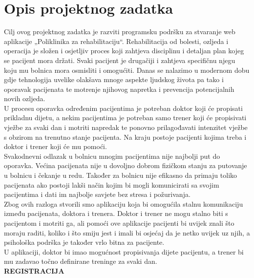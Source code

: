 \chapter{Opis projektnog zadatka}
		
		
		Cilj ovog projektnog zadatka je razviti programsku podršku za stvaranje web aplikacije „Poliklinika za rehabilitaciju“. Rehabilitacija od bolesti, ozljeda i operacija je složen i osjetljiv proces koji zahtjeva disciplinu i detaljan plan kojeg se pacijent mora držati. Svaki pacijent je drugačiji i zahtjeva specifičnu njegu koju mu bolnica mora osmisliti i omogućiti. Danas se nalazimo u modernom dobu gdje tehnologija uvelike olakšava mnoge aspekte ljudskog života pa tako i oporavak pacijenata te motrenje njihovog napretka i prevencija potencijalnih novih ozljeda.\\
		
		U procesu oporavka određenim pacijentima je potreban doktor koji će propisati prikladnu dijetu, a nekim pacijentima je potreban samo trener koji će propisivati vježbe za svaki dan i motriti napredak te ponovno prilagođavati intenzitet vježbe s obzirom na trenutno stanje pacijenta. Na kraju postoje pacijenti kojima treba i doktor i trener koji će mu pomoći.\\
		
		Svakodnevni odlazak u bolnicu mnogim pacijentima nije najbolji put do oporavka. Većina pacijenata nije u dovoljno dobrom fizičkom stanju za putovanje u bolnicu i čekanje u redu. Također za bolnicu nije efikasno da primaju toliko pacijenata ako postoji lakši način kojim bi mogli komunicirati sa svojim pacijentima i dati im najbolje savjete bez stresa i požurivanja.\\
		
		Zbog ovih razloga stvorili smo aplikaciju koja bi omogućila stalnu komunikaciju između pacijenata, doktora i trenera. Doktor i trener ne mogu stalno biti s pacijentom i motriti ga, ali pomoći ove aplikacije pacijenti bi uvijek znali što moraju raditi, koliko i što smiju jest i imali bi osjećaj da je netko uvijek uz njih, a psihološka podrška je također vrlo bitna za pacijente.\\
		
		U aplikaciji, doktor bi imao mogućnost propisivanja dijete pacijentu, a trener bi mu zadavao točno definirane treninge za svaki dan.\\
		\newpage
		\noindent \textbf{REGISTRACIJA}
		

